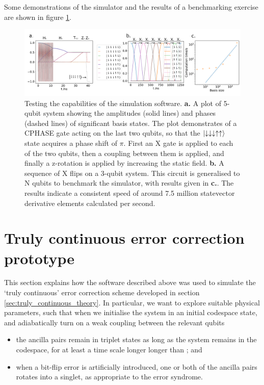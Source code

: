 \documentclass{report}
\begin{document}
Some demonstrations of the simulator and the results of a benchmarking exercise are shown in figure \ref{fig:benchmark}. 
\begin{figure}[ht]
    \centering
    \includegraphics[scale = 0.85]{Figures/benchmark/benchmarks.pdf}
    \caption{Testing the capabilities of the simulation software. \textbf{a.} A plot of 5-qubit system showing the amplitudes (solid lines) and phases (dashed lines) of significant basis states. The plot demonstrates of a CPHASE gate acting on the last two qubits, so that the $\ket{\downarrow\downarrow\downarrow\uparrow\uparrow}$ state acquires a phase shift of $\pi$. First an X gate is applied to each of the two qubits, then a coupling between them is applied, and finally a z-rotation is applied by increasing the static field\protect\footnotemark. \textbf{b.} A sequence of X flips on a 3-qubit system. This circuit is generalised to N qubits to benchmark the simulator, with results given in \textbf{c.}. The results indicate a consistent speed of around 7.5 million statevector derivative elements calculated per second.}
    \label{fig:benchmark}
\end{figure}
\section{Truly continuous error correction prototype}
This section explains how the software described above was used to simulate the `truly continuous' error correction scheme developed in section \ref{sec:truly_continuous_theory}. In particular, we want to explore suitable physical parameters, such that when we initialise the system in an initial codespace state, and adiabatically turn on a weak coupling between the relevant qubits
\begin{itemize}
    \item the ancilla pairs remain in triplet states as long as the system remains in the codespace, for at least a time scale longer longer than ; and
    \item when a bit-flip error is artificially introduced, one or both of the ancilla pairs rotates into a singlet, as appropriate to the error syndrome.
\end{itemize}
\end{document}
